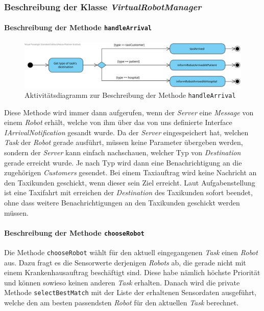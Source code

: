 	\subsubsection{Beschreibung der Klasse \textit{VirtualRobotManager}}
			\paragraph{Beschreibung der Methode \texttt{handleArrival}}
			\begin{figure}[H]
			\centering
			\includegraphics[width=1\textwidth]{img/HandleArrival}
			\caption{Aktivitätsdiagramm zur Beschreibung der Methode \texttt{handleArrival}}
			\label{SequenzQueuePoll}
			\end{figure}	
			Diese Methode wird immer dann aufgerufen, wenn der \textit{Server} eine \textit{Message} von einem \textit{Robot} erhält, welche von ihm über das von uns definierte Interface \textit{IArrivalNotification} gesandt wurde. Da der \textit{Server} eingespeichert hat, welchen \textit{Task} der \textit{Robot} gerade ausführt, müssen keine Parameter übergeben werden, sondern der \textit{Server} kann einfach nachschauen, welcher Typ von \textit{Destination} gerade erreicht wurde. Je nach Typ wird dann eine Benachrichtigung an die zugehörigen \textit{Customers} gesendet. Bei einem Taxiauftrag wird keine Nachricht an den Taxikunden geschickt, wenn dieser sein Ziel erreicht. Laut Aufgabenstellung ist eine Taxifahrt mit erreichen der \textit{Destination} des Taxikunden sofort beendet, ohne dass weitere Benachrichtigungen an den Taxikunden geschickt werden müssen.
			
			
			\paragraph{Beschreibung der Methode \texttt{chooseRobot}}
			Die Methode \texttt{chooseRobot} wählt für den aktuell eingegangenen \emph{Task} einen \emph{Robot} aus. 
			Dazu fragt es die Sensorwerte derjenigen \textit{Robots} ab, die gerade nicht mit einem Krankenhausauftrag beschäftigt sind. Diese habe nämlich höchste Priorität und können sowieso keinen anderen \textit{Task} erhalten. Danach wird die private Methode \texttt{selectBestMatch} mit der Liste der erhaltenen Sensordaten ausgeführt, welche den am besten passendsten \textit{Robot} für den aktuellen \textit{Task} berechnet.
				
